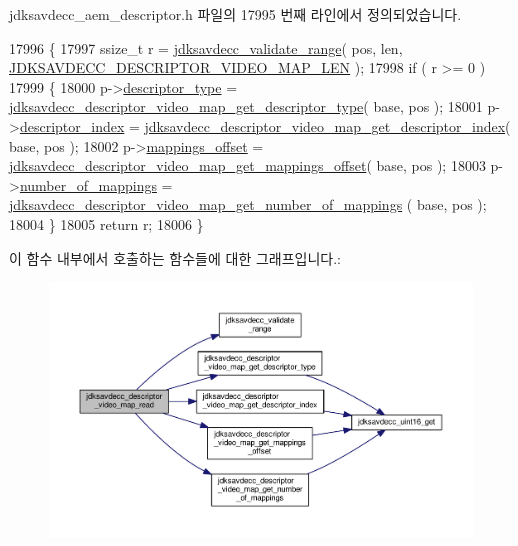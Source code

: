 jdksavdecc\+\_\+aem\+\_\+descriptor.\+h 파일의 17995 번째 라인에서 정의되었습니다.


\begin{DoxyCode}
17996 \{
17997     ssize\_t r = \hyperlink{group__util_ga9c02bdfe76c69163647c3196db7a73a1}{jdksavdecc\_validate\_range}( pos, len, 
      \hyperlink{group__descriptor__video__map_gae5c0ae299ea04d5b4fea8f932bf1c268}{JDKSAVDECC\_DESCRIPTOR\_VIDEO\_MAP\_LEN} );
17998     \textcolor{keywordflow}{if} ( r >= 0 )
17999     \{
18000         p->\hyperlink{structjdksavdecc__descriptor__video__unit__map_ab7c32b6c7131c13d4ea3b7ee2f09b78d}{descriptor\_type} = 
      \hyperlink{group__descriptor__video__map_ga34cea2c8475af9c7b8092f7e02fce3a9}{jdksavdecc\_descriptor\_video\_map\_get\_descriptor\_type}( 
      base, pos );
18001         p->\hyperlink{structjdksavdecc__descriptor__video__unit__map_a042bbc76d835b82d27c1932431ee38d4}{descriptor\_index} = 
      \hyperlink{group__descriptor__video__map_ga5ca5cd6a5dfc92ba7d64d944b7350c05}{jdksavdecc\_descriptor\_video\_map\_get\_descriptor\_index}( 
      base, pos );
18002         p->\hyperlink{structjdksavdecc__descriptor__video__unit__map_ac91a41273e32c7bf86ca390838721642}{mappings\_offset} = 
      \hyperlink{group__descriptor__video__map_ga10f05b897f70767280f5706a83865248}{jdksavdecc\_descriptor\_video\_map\_get\_mappings\_offset}( 
      base, pos );
18003         p->\hyperlink{structjdksavdecc__descriptor__video__unit__map_ac7db472c5622ef473d5d0a5c416d5531}{number\_of\_mappings} = 
      \hyperlink{group__descriptor__video__map_gad8f4c16046d4619731beaf777eaaaed5}{jdksavdecc\_descriptor\_video\_map\_get\_number\_of\_mappings}
      ( base, pos );
18004     \}
18005     \textcolor{keywordflow}{return} r;
18006 \}
\end{DoxyCode}


이 함수 내부에서 호출하는 함수들에 대한 그래프입니다.\+:
\nopagebreak
\begin{figure}[H]
\begin{center}
\leavevmode
\includegraphics[width=350pt]{group__descriptor__video__map_ga3252eb1bbd7858899721a08add38f093_cgraph}
\end{center}
\end{figure}


